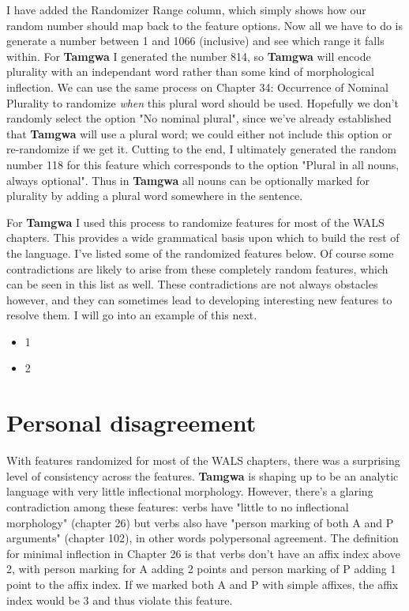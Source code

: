 \documentclass[a4paper,12pt,twoside,openright]{memoir}
\begin{document}
    I have added the Randomizer Range column, which simply shows how our random number should map back to the feature options.  Now all we have to do is generate a number between 1 and 1066 (inclusive) and see which range it falls within.  For \textbf{Tamgwa} I generated the number 814, so \textbf{Tamgwa} will encode plurality with an independant word rather than some kind of morphological inflection.  We can use the same process on Chapter 34: Occurrence of Nominal Plurality to randomize \textit{when} this plural word should be used.  Hopefully we don't randomly select the option "No nominal plural", since we've already established that \textbf{Tamgwa} will use a plural word; we could either not include this option or re-randomize if we get it.  Cutting to the end, I ultimately generated the random number 118 for this feature which corresponds to the option "Plural in all nouns, always optional".  Thus in \textbf{Tamgwa} all nouns can be optionally marked for plurality by adding a plural word somewhere in the sentence.

    For \textbf{Tamgwa} I used this process to randomize features for most of the WALS chapters.  This provides a wide grammatical basis upon which to build the rest of the language.  I've listed some of the randomized features below.  Of course some contradictions are likely to arise from these completely random features, which can be seen in this list as well.  These contradictions are not always obstacles however, and they can sometimes lead to developing interesting new features to resolve them.  I will go into an example of this next.

\begin{itemize}
    \item 1
    \item 2
\end{itemize}

\section*{Personal disagreement} %

    With features randomized for most of the WALS chapters, there was a surprising level of consistency across the features.  \textbf{Tamgwa} is shaping up to be an analytic language with very little inflectional morphology. However, there's a glaring contradiction among these features: verbs have "little to no inflectional morphology" (chapter 26) but verbs also have "person marking of both A and P arguments" (chapter 102), in other words polypersonal agreement.  The definition for minimal inflection in Chapter 26 is that verbs don't have an affix index above 2, with person marking for A adding 2 points and person marking of P adding 1 point to the affix index.  If we marked both A and P with simple affixes, the affix index would be 3 and thus violate this feature.
\end{document}
